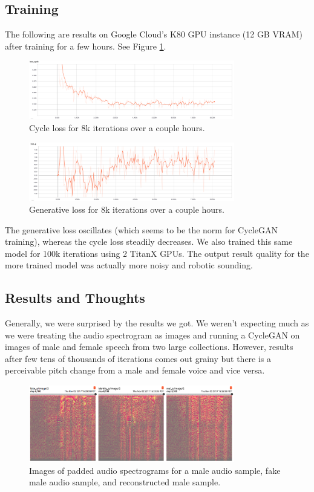 \documentclass[a4paper]{article}
\begin{document}
\subsection{Training}
The following are results on Google Cloud's K80 GPU instance (12 GB VRAM) after training for a few hours. See Figure \ref{fig:cycleloss}.
\begin{figure}[!htb]
\centering
\includegraphics[width=0.8\textwidth]{cyclegan_cycleloss.png}
\caption{\label{fig:cycleloss}Cycle loss for 8k iterations over a couple hours.}
\end{figure}

\begin{figure}[!htb]
\centering
\includegraphics[width=0.8\textwidth]{cyclegan_genloss.png}
\caption{\label{fig:genloss}Generative loss for 8k iterations over a couple hours.}
\end{figure}

The generative loss oscillates (which seems to be the norm for CycleGAN training), whereas the cycle loss steadily decreases. We also trained this same model for 100k iterations using 2 TitanX GPUs. The output result quality for the more trained model was actually more noisy and robotic sounding. 

\subsection{Results and Thoughts}
Generally, we were surprised by the results we got. We weren't expecting much as we were treating the audio spectrogram as images and running a CycleGAN on images of male and female speech from two large collections. However, results after few tens of thousands of iterations comes out grainy but there is a perceivable pitch change from a male and female voice and vice versa.

\begin{figure}[!htb]
\centering
\includegraphics[width=0.8\textwidth]{a_prog_8k.png}
\caption{\label{fig:cycle_comparison}Images of padded audio spectrograms for a male audio sample, fake male audio sample, and reconstructed male sample.}
\end{figure}
\end{document}
